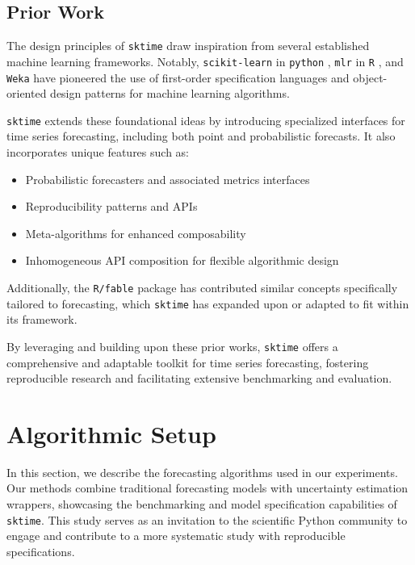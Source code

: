 \subsection{Prior Work}
The design principles of \texttt{sktime} draw inspiration from several established machine learning frameworks. Notably, \texttt{scikit-learn} in \texttt{python} \cite{pedregosa2011scikit}, \texttt{mlr} in \texttt{R} \cite{bischl2016mlr}, and \texttt{Weka} \cite{hall2009weka} have pioneered the use of first-order specification languages and object-oriented design patterns for machine learning algorithms. 

\texttt{sktime} extends these foundational ideas by introducing specialized interfaces for time series forecasting, including both point and probabilistic forecasts. It also incorporates unique features such as:
\begin{itemize}
    \item Probabilistic forecasters and associated metrics interfaces
    \item Reproducibility patterns and APIs
    \item Meta-algorithms for enhanced composability
    \item Inhomogeneous API composition for flexible algorithmic design
\end{itemize}

Additionally, the \texttt{R/fable} package \cite{hyndman2020package} has contributed similar concepts specifically tailored to forecasting, which \texttt{sktime} has expanded upon or adapted to fit within its framework.

By leveraging and building upon these prior works, \texttt{sktime} offers a comprehensive and adaptable toolkit for time series forecasting, fostering reproducible research and facilitating extensive benchmarking and evaluation.

\section{Algorithmic Setup} \label{methods}

In this section, we describe the forecasting algorithms used in our experiments. Our methods combine traditional forecasting models with uncertainty estimation wrappers, showcasing the benchmarking and model specification capabilities of \texttt{sktime}. This study serves as an invitation to the scientific Python community to engage and contribute to a more systematic study with reproducible specifications.

